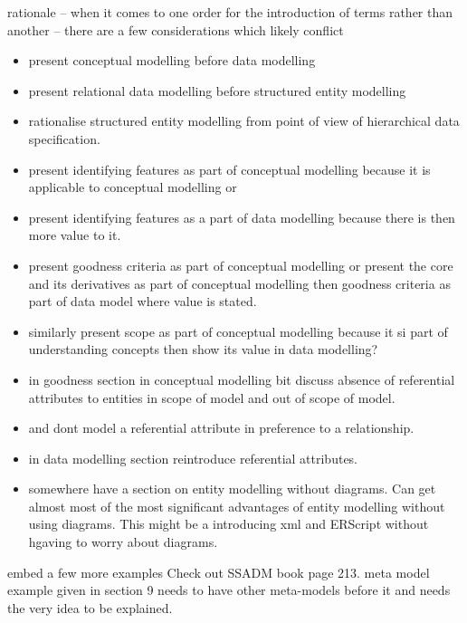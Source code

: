 \mynote rationale -- when it comes to one order for the introduction of terms rather than another -- there are a few considerations which likely conflict
\begin{itemize}
	\item  present conceptual modelling before data modelling
	\item  present relational data modelling before structured entity modelling
	\item rationalise structured entity modelling from point of view of hierarchical data specification. 
	\item  present identifying features as part of conceptual modelling because
	it is applicable to conceptual modelling or
	\item  present identifying features as a part of data modelling
	because there is then more value to it.
	\item   present goodness criteria as part of conceptual modelling
	or present the core and its derivatives as part of conceptual modelling then goodness criteria as part of data model where value is stated.
	\item similarly present scope as part of conceptual modelling because it si part of understanding concepts then show its value in data modelling? 
	\item in goodness section in conceptual modelling bit discuss absence of referential attributes to entities in scope of model and out of scope of model.
	\item and dont model a referential attribute in preference to a relationship.
	\item in data modelling section reintroduce referential attributes. 
	\item somewhere have a section on entity modelling without diagrams. Can get almost most of the most significant advantages of entity modelling without using diagrams. This might be a  introducing xml and ERScript without hgaving to worry about diagrams.
\end{itemize}

\mynote embed a few more examples Check out SSADM book page 213. 
\mynote meta model example given in section 9 needs to have other meta-models before it and needs the very idea to be explained.
